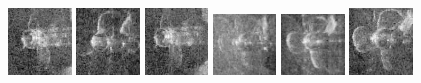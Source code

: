 \begin{figure}
    \includegraphics[width=0.15\textwidth]{chapters/images/dataset/all-class-images/propeler/propeler-4.jpg}
    \includegraphics[width=0.15\textwidth]{chapters/images/dataset/all-class-images/propeler/propeler-72.jpg}
    \includegraphics[width=0.15\textwidth]{chapters/images/dataset/all-class-images/propeler/propeler-2.jpg}
    \includegraphics[width=0.15\textwidth]{chapters/images/dataset/all-class-images/propeler/propeler-82.jpg}
    \includegraphics[width=0.15\textwidth]{chapters/images/dataset/all-class-images/propeler/propeler-105.jpg}
    \includegraphics[width=0.15\textwidth]{chapters/images/dataset/all-class-images/propeler/propeler-60.jpg}
    

\end{figure}
